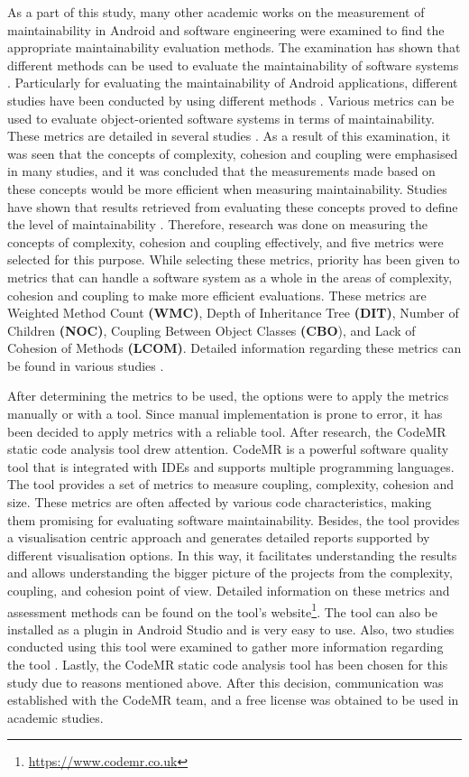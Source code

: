 As a part of this study, many other academic works on the measurement of maintainability in Android and software engineering were examined to find the appropriate maintainability evaluation methods. The examination has shown that different methods can be used to evaluate the maintainability of software systems \cite{45,49}. Particularly for evaluating the maintainability of Android applications, different studies have been conducted by using different methods \cite{43,34}. Various metrics can be used to evaluate object-oriented software systems in terms of maintainability. These metrics are detailed in several studies \cite{33,36}. As a result of this examination, it was seen that the concepts of complexity, cohesion and coupling were emphasised in many studies, and it was concluded that the measurements made based on these concepts would be more efficient when measuring maintainability. Studies have shown that results retrieved from evaluating these concepts proved to define the level of maintainability \cite{33}. Therefore, research was done on measuring the concepts of complexity, cohesion and coupling effectively, and five metrics were selected for this purpose. While selecting these metrics, priority has been given to metrics that can handle a software system as a whole in the areas of complexity, cohesion and coupling to make more efficient evaluations. These metrics are Weighted Method Count \textbf{(WMC)}, Depth of Inheritance Tree \textbf{(DIT)}, Number of Children \textbf{(NOC)}, Coupling Between Object Classes \textbf{(CBO}), and Lack of Cohesion of Methods \textbf{(LCOM)}. Detailed information regarding these metrics can be found in various studies \cite{33,34,35,36}.

After determining the metrics to be used, the options were to apply the metrics manually or with a tool. Since manual implementation is prone to error, it has been decided to apply metrics with a reliable tool. After research, the CodeMR static code analysis tool drew attention. CodeMR is a powerful software quality tool that is integrated with IDEs and supports multiple programming languages. The tool provides a set of metrics to measure coupling, complexity, cohesion and size. These metrics are often affected by various code characteristics, making them promising for evaluating software maintainability. Besides, the tool provides a visualisation centric approach and generates detailed reports supported by different visualisation options. In this way, it facilitates understanding the results and allows understanding the bigger picture of the projects from the complexity, coupling, and cohesion point of view. Detailed information on these metrics and assessment methods can be found on the tool's website\footnote{\url{https://www.codemr.co.uk}}. The tool can also be installed as a plugin in Android Studio and is very easy to use. Also, two studies conducted using this tool were examined to gather more information regarding the tool \cite{38,39}. Lastly, the CodeMR static code analysis tool has been chosen for this study due to reasons mentioned above. After this decision, communication was established with the CodeMR team, and a free license was obtained to be used in academic studies. 

